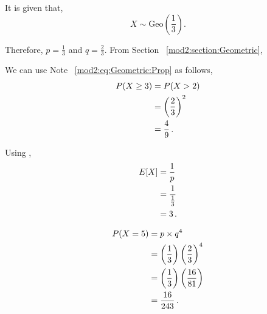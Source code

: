 \begin{subquestions}
\begin{subsubquestions}
\end{subsubquestions}


\subquestion

It is given that,
\begin{equation}
	X \sim \text{Geo}(\frac{1}{3}).
\end{equation}

Therefore, $p=\frac{1}{3}$ and $q=\frac{2}{3}$. From Section ~\ref{mod2:section:Geometric},

\begin{subsubquestions}

\subsubquestion
We can use Note ~\ref{mod2:eq:Geometric:Prop} as follows,
\begin{align}
	P(X \geq 3) & = P(X > 2) \nonumber \\
	            & = \left(\frac{2}{3} \right)^2 \nonumber \\
	            & = \frac{4}{9} \,.
\end{align}


\subsubquestion
Using ,
\begin{align}
	E[X] & = \frac{1}{p} \nonumber \\
	     & = \frac{1}{\frac{1}{3}} \nonumber \\
	     & = 3 \,.
\end{align}


\subsubquestion

\begin{align}
	P(X=5) & = p \times q^4 \nonumber \\
	       & = \left(\frac{1}{3} \right) \left(\frac{2}{3} \right)^4 \nonumber \\
	       & = \left(\frac{1}{3} \right) \left(\frac{16}{81} \right) \nonumber \\
           & = \frac{16}{243} \,. 
\end{align}

\end{subsubquestions}



\end{subquestions}
